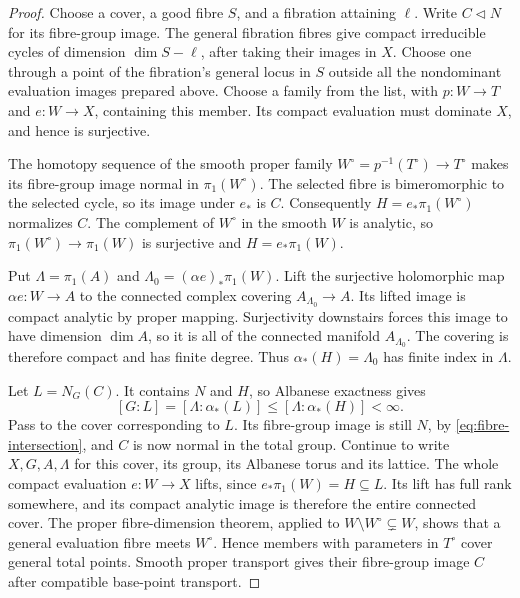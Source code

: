 \begin{proof}
Choose a cover, a good fibre \(S\), and a fibration attaining
\(\ell\). Write \(C\triangleleft N\) for its fibre-group image.
The general fibration fibres give compact irreducible cycles of
dimension \(\dim S-\ell\), after taking their images in \(X\).
Choose one through a point of the fibration's general locus in
\(S\) outside all the nondominant evaluation images prepared
above. Choose a family from the list, with \(p:W\to T\) and
\(e:W\to X\), containing this member. Its compact evaluation must dominate \(X\),
and hence is surjective.

The homotopy sequence of the smooth proper family
\(W^\circ=p^{-1}(T^\circ)\to T^\circ\) makes its fibre-group image
normal in \(\pi_1(W^\circ)\). The selected fibre is bimeromorphic
to the selected cycle, so its image under \(e_*\) is \(C\).
Consequently \(H=e_*\pi_1(W^\circ)\) normalizes \(C\).
The complement of \(W^\circ\) in the smooth \(W\) is analytic,
so \(\pi_1(W^\circ)\to\pi_1(W)\) is surjective and
\(H=e_*\pi_1(W)\).

Put \(\Lambda=\pi_1(A)\) and
\(\Lambda_0=(\alpha e)_*\pi_1(W)\). Lift the surjective holomorphic
map \(\alpha e:W\to A\) to the connected complex covering
\(A_{\Lambda_0}\to A\). Its lifted image is compact analytic by
proper mapping. Surjectivity downstairs forces this image to have
dimension \(\dim A\), so it is all of the connected manifold
\(A_{\Lambda_0}\). The covering is therefore compact and has finite
degree. Thus \(\alpha_*(H)=\Lambda_0\) has finite index in \(\Lambda\).

Let \(L=N_G(C)\). It contains \(N\) and \(H\), so Albanese exactness
gives
\[
 [G:L]=[\Lambda:\alpha_*(L)]
 \le[\Lambda:\alpha_*(H)]<\infty.
\]
Pass to the cover corresponding to \(L\). Its fibre-group image is
still \(N\), by \eqref{eq:fibre-intersection}, and \(C\) is now normal
in the total group. Continue to write \(X,G,A,\Lambda\) for this
cover, its group, its Albanese torus and its lattice. The whole
compact evaluation \(e:W\to X\) lifts,
since \(e_*\pi_1(W)=H\subseteq L\). Its lift has full rank somewhere,
and its compact analytic image is therefore the entire connected cover.
The proper fibre-dimension theorem, applied to
\(W\setminus W^\circ\subsetneq W\), shows that a general evaluation
fibre meets \(W^\circ\). Hence members with parameters in \(T^\circ\)
cover general total points. Smooth proper transport gives their fibre-group image
\(C\) after compatible base-point transport.


\end{proof}
